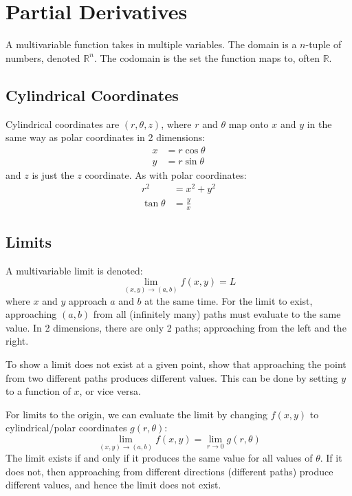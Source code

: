 \documentclass{article}
\begin{document}
\section{Partial Derivatives}

A multivariable function takes in multiple variables. The domain is a $n$-tuple of numbers, denoted $\mathbb R^n$. The codomain is the set the function maps to, often $\mathbb R$.

\subsection{Cylindrical Coordinates}

Cylindrical coordinates are $(r,\theta,z)$, where $r$ and $\theta$ map onto $x$ and $y$ in the same way as polar coordinates in 2 dimensions:
\begin{align*}
	x&=r\cos\theta \\
	y&=r\sin\theta
\end{align*}
and $z$ is just the $z$ coordinate. As with polar coordinates:
\begin{align*}
	r^2&=x^2+y^2 \\
	\tan\theta&=\frac{y}{x}
\end{align*}

\subsection{Limits}

A multivariable limit is denoted:
\begin{equation*}
    \lim_{(x,y)\to(a,b)}f(x,y)=L
\end{equation*}
where $x$ and $y$ approach $a$ and $b$ at the same time. For the limit to exist, approaching $(a,b)$ from all (infinitely many) paths must evaluate to the same value. In 2 dimensions, there are only 2 paths; approaching from the left and the right.

To show a limit does not exist at a given point, show that approaching the point from two different paths produces different values. This can be done by setting $y$ to a function of $x$, or vice versa.

For limits to the origin, we can evaluate the limit by changing $f(x,y)$ to cylindrical/polar coordinates $g(r,\theta)$:
\begin{equation*}
    \lim_{(x,y)\to(a,b)}f(x,y)
	=\lim_{r\to0}g(r,\theta)
\end{equation*}
The limit exists if and only if it produces the same value for all values of $\theta$. If it does not, then approaching from different directions (different paths) produce different values, and hence the limit does not exist.
\end{document}

